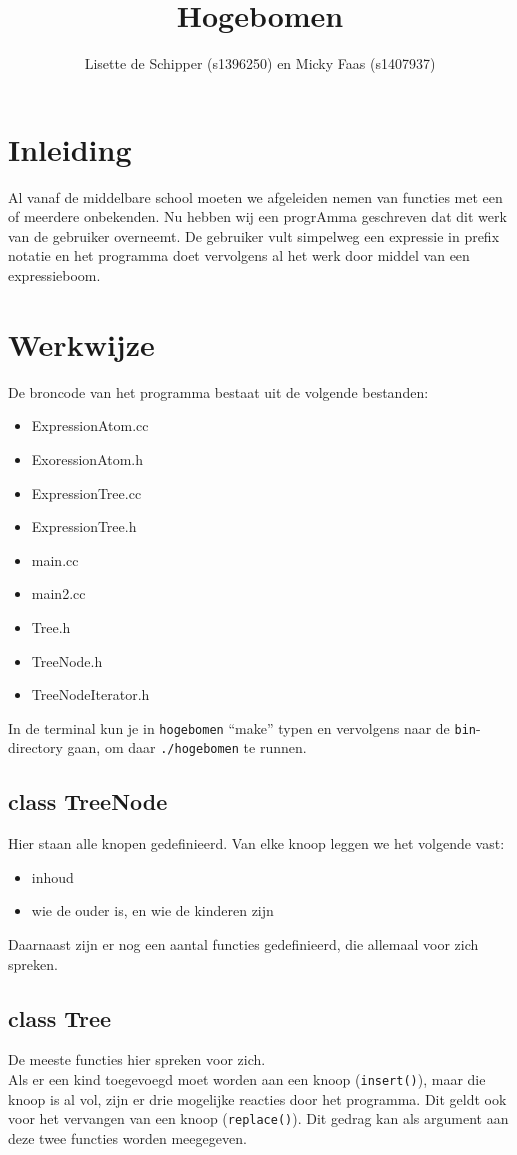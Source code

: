 \documentclass[a4paper,10pt]{article}
\title{ Hogebomen }
\author{ Lisette de Schipper (s1396250) en Micky Faas (s1407937) }
\date{}
\begin{document}
\maketitle

\section*{Inleiding}
Al vanaf de middelbare school moeten we afgeleiden nemen van functies met een of meerdere onbekenden.
Nu hebben wij een progrAmma geschreven dat dit werk van de gebruiker overneemt.
De gebruiker vult simpelweg een expressie in prefix notatie en het programma doet vervolgens al het werk door middel van een expressieboom.

\section*{Werkwijze}
De broncode van het programma bestaat uit de volgende bestanden:
\begin{itemize}
 \item ExpressionAtom.cc
 \item ExoressionAtom.h
 \item ExpressionTree.cc
 \item ExpressionTree.h
 \item main.cc
 \item main2.cc
 \item Tree.h
 \item TreeNode.h
 \item TreeNodeIterator.h
\end{itemize}

\noindent In de terminal kun je in \texttt{hogebomen} ``make'' typen en vervolgens naar de \texttt{bin}-directory gaan, om daar \texttt{./hogebomen} te runnen.

\subsection*{class TreeNode}
Hier staan alle knopen gedefinieerd.
Van elke knoop leggen we het volgende vast:
\begin{itemize}
 \item inhoud
 \item wie de ouder is, en wie de kinderen zijn
\end{itemize}
Daarnaast zijn er nog een aantal functies gedefinieerd, die allemaal voor zich spreken.

\subsection*{class Tree}
De meeste functies hier spreken voor zich. \\
Als er een kind toegevoegd moet worden aan een knoop (\texttt{insert()}), maar die knoop is al vol,
zijn er drie mogelijke reacties door het programma. Dit geldt ook voor het vervangen van een knoop (\texttt{replace()}). Dit gedrag kan als argument aan deze twee functies worden meegegeven.
\end{document}
